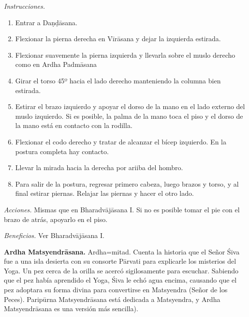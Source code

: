 \emph{Instrucciones.}
\begin{enumerate}
\item Entrar a Daṇḍāsana.
\item Flexionar la pierna derecha en Vīrāsana
y dejar la izquierda estirada.
\item Flexionar suavemente la pierna
izquierda y llevarla sobre el muslo derecho
como en Ardha Padmāsana
\item Girar el torso 45º hacia el lado
derecho manteniendo la columna bien estirada.
\item Estirar el brazo izquierdo y apoyar el
dorso de la mano en el lado externo del muslo
izquierdo. Si es posible, la palma de la mano
toca el piso y el dorso de la mano está en
contacto con la rodilla.
\item Flexionar el codo derecho y tratar de
alcanzar el bícep izquierdo. En la postura
completa hay contacto.
\item Llevar la mirada hacia la derecha por
ariiba del hombro.
\item Para salir de la postura, regresar
primero cabeza, luego brazos y torso, y al
final estirar piernas. Relajar las piernas y
hacer el otro lado.
\end{enumerate}

\emph{Acciones.} Mismas que en Bharadvājāsana
I. Si no es posible tomar el pie con el brazo
de atrás, apoyarlo en el piso.

\emph{Beneficios.} Ver Bharadvājāsana I.

\medskip\noindent\textbf{Ardha
Matsyendrāsana.}
Ardha=mitad. Cuenta la historia que el Señor
Śiva fue a una isla desierta con su consorte
Pārvati para explicarle los misterios del
Yoga. Un pez cerca de la orilla se acercó
sigilosamente para escuchar. Sabiendo que el
pez había aprendido el Yoga, Śiva le echó
agua encima, causando que el pez adoptara su
forma divina para convertirse en Matsyendra
(Señor de los Peces). Paripūrna
Matsyendrāsana está dedicada a Matsyendra, y
Ardha Matsyendrāsana es una versión más
sencilla).

